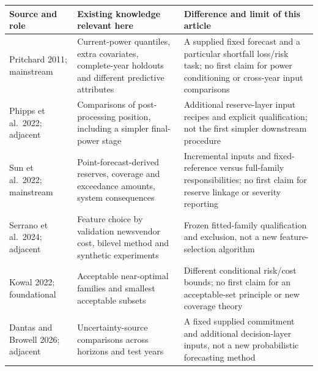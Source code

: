 \documentclass[
  british,
  11pt,
]{article}
\newcounter{none} %
\begin{document}
{\def\LTcaptype{none} %
\begin{longtable}[]{@{}
  >{\raggedright\arraybackslash}p{}
  >{\raggedright\arraybackslash}p{}
  >{\raggedright\arraybackslash}p{}@{}}
\toprule\noalign{}
\begin{minipage}[b]{\linewidth}\raggedright
Source and role
\end{minipage} & \begin{minipage}[b]{\linewidth}\raggedright
Existing knowledge relevant here
\end{minipage} & \begin{minipage}[b]{\linewidth}\raggedright
Difference and limit of this article
\end{minipage} \\
\midrule\noalign{}
\endhead
\bottomrule\noalign{}
\endlastfoot
Pritchard 2011; mainstream & Current-power quantiles, extra covariates,
complete-year holdouts and different predictive attributes & A supplied
fixed forecast and a particular shortfall loss/risk task; no first claim
for power conditioning or cross-year input comparisons \\
Phipps et al.~2022; adjacent & Comparisons of post-processing position,
including a simpler final-power stage & Additional reserve-layer input
recipes and explicit qualification; not the first simpler downstream
procedure \\
Sun et al.~2022; mainstream & Point-forecast-derived reserves, coverage
and exceedance amounts, system consequences & Incremental inputs and
fixed-reference versus full-family responsibilities; no first claim for
reserve linkage or severity reporting \\
Serrano et al.~2024; adjacent & Feature choice by validation newsvendor
cost, bilevel method and synthetic experiments & Frozen fitted-family
qualification and exclusion, not a new feature-selection algorithm \\
Kowal 2022; foundational & Acceptable near-optimal families and smallest
acceptable subsets & Different conditional risk/cost bounds; no first
claim for an acceptable-set principle or new coverage theory \\
Dantas and Browell 2026; adjacent & Uncertainty-source comparisons
across horizons and test years & A fixed supplied commitment and
additional decision-layer inputs, not a new probabilistic forecasting
method \\
\end{longtable}
}
\end{document}
